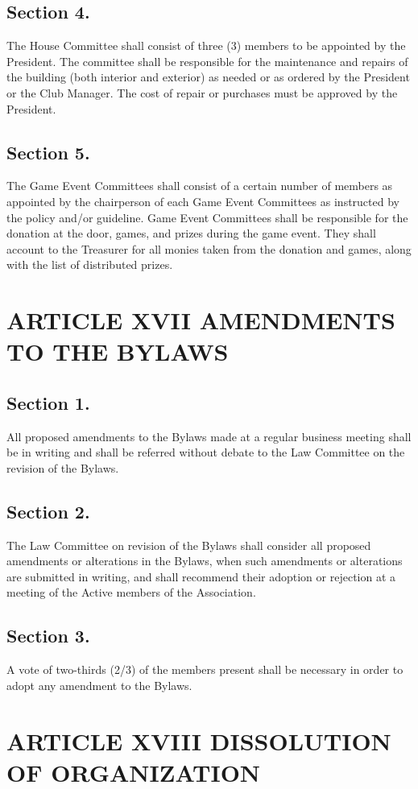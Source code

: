 \documentclass[12pt,letterpaper]{article}
\begin{document}
\subsection*{Section 4.} The House Committee shall consist of three (3) members to be appointed
by the President. The committee shall be responsible for the maintenance and repairs of
the building (both interior and exterior) as needed or as ordered by the President or the
Club Manager. The cost of repair or purchases must be approved by the President.
\subsection*{Section 5.} The Game Event Committees shall consist of a certain number of
members as appointed by the chairperson of each Game Event Committees as instructed
by the policy and/or guideline. Game Event Committees shall be responsible for the
donation at the door, games, and prizes during the game event. They shall account to
the Treasurer for all monies taken from the donation and games, along with the list of
distributed prizes.

\section*{ARTICLE XVII
AMENDMENTS TO THE BYLAWS}

\subsection*{Section 1.} All proposed amendments to the Bylaws made at a regular business meeting
shall be in writing and shall be referred without debate to the Law Committee on the
revision of the Bylaws.
\subsection*{Section 2.} The Law Committee on revision of the Bylaws shall consider all proposed
amendments or alterations in the Bylaws, when such amendments or alterations are
submitted in writing, and shall recommend their adoption or rejection at a meeting of
the Active members of the Association.
\subsection*{Section 3.} A vote of two-thirds (2/3) of the members present shall be necessary in
order to adopt any amendment to the Bylaws.

\section*{ARTICLE XVIII
DISSOLUTION OF ORGANIZATION}
\end{document}
